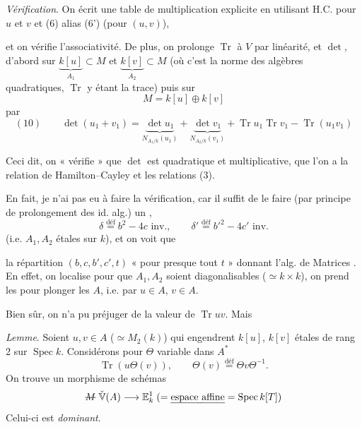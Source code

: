 \documentclass[11pt,a4paper]{article}
\begin{document}
\emph{Vérification}. On écrit une table de multiplication explicite en utilisant H.C. pour $u$ et $v$ et (6) alias (6') (pour $(u, v)$),

et on vérifie l'associativité. De plus, on prolonge $\operatorname{Tr}$ à $V$ par linéarité, et $\det$,  d'abord sur $\underbrace{k[u]}_{A_1} \subset M$ et $\underbrace{k[v]}_{A_2} \subset M$ (où c'est la norme  des algèbres quadratiques, $\operatorname{Tr}$ y étant la trace) puis sur
\[
M = k[u] \oplus k[v]
\]
par
\[
(10)\qquad \det(u_1 + v_1) = \underbrace{\det u_1}_{N_{A_1/k}(u_1)} + \underbrace{\det v_1}_{N_{A_2/k}(v_1)} + \operatorname{Tr} u_1 \operatorname{Tr} v_1 - \operatorname{Tr}(u_1v_1)
\]

Ceci dit, on « vérifie » \struck{\ill{}} que $\det$ est quadratique et multiplicative, que l'on a la relation de Hamilton--Cayley et les relations (3).

En fait, je n'ai pas eu à faire la vérification, car  il suffit de le faire (par principe de prolongement des id. alg.)  un , 
\[
\delta \overset{\text{déf}}{=} b^2 - 4c \text{ inv.}, \qquad \delta' \overset{\text{déf}}{=} b'^2 - 4c' \text{ inv.}
\]
(i.e. $A_1, A_2$ étales sur $k$), et on voit  que   

la répartition $(b, c, b', c', t)$ « pour presque tout $t$ »   donnant l'alg. de Matrices . En effet,   on localise pour que $A_1, A_2$ soient diagonalisables ($\simeq k \times k$), on prend les \ill{}  pour plonger les $A$, i.e. par $u \in A$, $v \in A$.

Bien sûr, on n'a  pu préjuger de la valeur de $\operatorname{Tr} uv$. Mais 

\emph{Lemme}. Soient $u, v \in A$ ($\simeq M_2(k)$) qui  engendrent $k[u]$, $k[v]$ étales de rang 2 sur $\operatorname{Spec} k$. Considérons pour $\Theta$ variable dans $A^*$
\[
\operatorname{Tr}(u\Theta(v)), \qquad \Theta(v) \overset{\text{déf}}{=} \Theta v \Theta^{-1} .
\]
On trouve un morphisme de schémas
\[
\text{\struck{$M$}}\; \check{\mathbb{V}}(A) \longrightarrow \mathbb{E}^1_k \;(= \text{\uncertain{espace affine}} = \operatorname{Spec} k[T])
\]
Celui-ci est \emph{dominant}.
\end{document}
